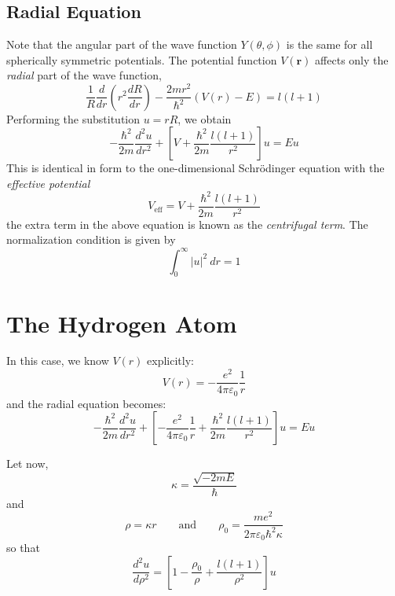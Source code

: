 \subsection{Radial Equation}
Note that the angular part of the wave function $Y(\theta,\phi)$ is the same for all spherically symmetric potentials. The potential function $V(\mathbf{r})$ affects only the \textit{radial} part of the wave function,
\begin{equation*}
    \frac{1}{R}\frac{d}{dr}\left(r^2\frac{dR}{dr}\right) - \frac{2mr^2}{\hbar^2}(V(r) - E) = l(l + 1)
\end{equation*}
Performing the substitution $u = rR$, we obtain
\begin{equation*}
    -\frac{\hbar^2}{2m}\frac{d^2u}{dr^2} + \left[V + \frac{\hbar^2}{2m}\frac{l(l + 1)}{r^2}\right]u = Eu
\end{equation*}
This is identical in form to the one-dimensional Schr\"odinger equation with the \textit{effective potential}
\begin{equation*}
    V_\text{eff} = V + \frac{\hbar^2}{2m}\frac{l(l + 1)}{r^2}
\end{equation*}
the extra term in the above equation is known as the \textit{centrifugal term}. The normalization condition is given by 
\begin{equation*}
    \int_0^\infty |u|^2~dr = 1
\end{equation*}

\section{The Hydrogen Atom}
In this case, we know $V(r)$ explicitly:
\begin{equation*}
    V(r) = -\frac{e^2}{4\pi\varepsilon_0}\frac{1}{r}
\end{equation*}
and the radial equation becomes:
\begin{equation*}
    -\frac{\hbar^2}{2m}\frac{d^2u}{dr^2} + \left[-\frac{e^2}{4\pi\varepsilon_0}\frac{1}{r} + \frac{\hbar^2}{2m}\frac{l(l + 1)}{r^2}\right]u = Eu
\end{equation*}

Let now, 
\begin{equation*}
    \kappa = \frac{\sqrt{-2mE}}{\hbar}
\end{equation*}
and 
\begin{equation*}
    \rho = \kappa r \qquad\text{and}\qquad \rho_0 = \frac{me^2}{2\pi\varepsilon_0\hbar^2\kappa}
\end{equation*}
so that 
\begin{equation*}
    \frac{d^2 u}{d\rho^2} = \left[1 - \frac{\rho_0}{\rho} + \frac{l(l + 1)}{\rho^2}\right]u
\end{equation*}

